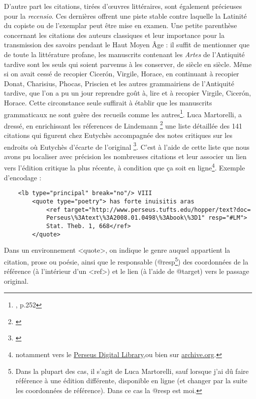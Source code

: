 \documentclass[a4paper, twoside, 12pt]{book}
\begin{document}
D'autre part les citations, tirées d'œuvres littéraires, sont également précieuses pour la \textit{recensio}. Ces dernières offrent une piste stable contre laquelle la \og{} Latinité \fg{} du copiste ou de l'exemplar peut être mise en examen. Une petite parenthèse concernant les citations des auteurs classiques et leur importance pour la transmission des savoirs pendant le Haut Moyen Âge : il suffit de mentionner que de toute la littérature profane, les manuscrits contenant les \textit{Artes} de l'Antiquité tardive sont les seuls qui soient parvenus à les conserver, de siècle en siècle. Même si on avait cessé de recopier Cicerón, Virgile, Horace, en continuant à recopier Donat, Charisius, Phocas, Priscien et les autres grammairiens de l'Antiquité tardive, que l'on a pu un jour reprendre goût à, lire et à recopier Virgile, Cicerón, Horace. Cette circonstance seule suffirait à établir que les manuscrits grammaticaux ne sont guère des recueils comme les autres\footnote{\cite{holtz1978typologie}, p.252}. Luca Martorelli, a dressé, en enrichissant les réferences de Lindemann \footnote{\cite{lindemann1833corpus}} une liste détaillée des 141 citations qui figurent chez Eutychès accompagnée des notes critiques sur les endroits où Eutychès d'écarte de l'original \footnote{\cite{martorelli2017citazioni}}.  C'est à l'aide de cette liste que nous avons pu localiser avec précision les nombreuses citations et leur associer un lien vers l'édition critique la plus récente, à condition que ça soit en ligne\footnote{notamment vers le {\href{http://www.perseus.tufts.edu/hopper/}{Perseus Digital Library}},ou bien sur {\href{https://archive.org/}{archive.org}}.}. Exemple d'encodage : \\

\begin{verbatim}
    <lb type="principal" break="no"/> VIII 
        <quote type="poetry"> has forte inuisitis aras
            <ref target="http://www.perseus.tufts.edu/hopper/text?doc=
            Perseus\%3Atext\%3A2008.01.0498\%3Abook\%3D1" resp="#LM"> 
            Stat. Theb. 1, 668</ref>
        </quote>
\end{verbatim}


Dans un environnement <quote>, on indique le genre auquel appartient la citation, prose ou poésie, ainsi que le responsable (@resp\footnote{Dans la plupart des cas, il s'agit de Luca Martorelli, sauf lorsque j'ai dû faire référence à une édition différente, disponible en ligne (et changer par la suite les coordonnées de référence). Dans ce cas la @resp est moi.}) des coordonnées de la référence (à l'intérieur d'un <ref>) et le lien (à l'aide de @target) vers le passage original.
\end{document}
